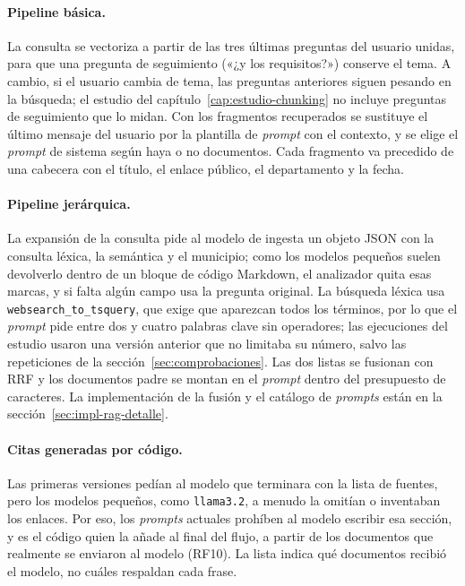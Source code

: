\paragraph{Pipeline básica.} La consulta se vectoriza a partir de las tres últimas preguntas del usuario unidas, para que una pregunta de seguimiento («¿y los requisitos?») conserve el tema. A cambio, si el usuario cambia de tema, las preguntas anteriores siguen pesando en la búsqueda; el estudio del capítulo~\ref{cap:estudio-chunking} no incluye preguntas de seguimiento que lo midan. Con los fragmentos recuperados se sustituye el último mensaje del usuario por la plantilla de \emph{prompt} con el contexto, y se elige el \emph{prompt} de sistema según haya o no documentos. Cada fragmento va precedido de una cabecera con el título, el enlace público, el departamento y la fecha.

\paragraph{Pipeline jerárquica.} La expansión de la consulta pide al modelo de ingesta un objeto JSON con la consulta léxica, la semántica y el municipio; como los modelos pequeños suelen devolverlo dentro de un bloque de código Markdown, el analizador quita esas marcas, y si falta algún campo usa la pregunta original. La búsqueda léxica usa \texttt{websearch\_to\_tsquery}, que exige que aparezcan todos los términos, por lo que el \emph{prompt} pide entre dos y cuatro palabras clave sin operadores; las ejecuciones del estudio usaron una versión anterior que no limitaba su número, salvo las repeticiones de la sección~\ref{sec:comprobaciones}. Las dos listas se fusionan con RRF \cite{cormack2009} y los documentos padre se montan en el \emph{prompt} dentro del presupuesto de caracteres. La implementación de la fusión y el catálogo de \emph{prompts} están en la sección~\ref{sec:impl-rag-detalle}.

\paragraph{Citas generadas por código.} Las primeras versiones pedían al modelo que terminara con la lista de fuentes, pero los modelos pequeños, como \texttt{llama3.2}, a menudo la omitían o inventaban los enlaces. Por eso, los \emph{prompts} actuales prohíben al modelo escribir esa sección, y es el código quien la añade al final del flujo, a partir de los documentos que realmente se enviaron al modelo (RF10). La lista indica qué documentos recibió el modelo, no cuáles respaldan cada frase.

